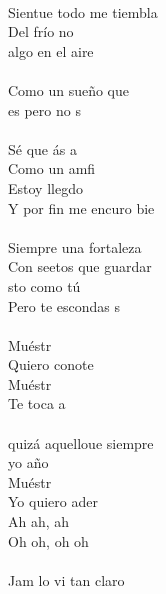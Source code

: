 \begin{cancion}%
	     \chord{(}{**)}{    }\\
	Sientue todo me tiembla \\
	Del frío no \\
	 algo en el aire\\
	\jump\\
Como un sueño que \\
	es pero no s\\
	\jump\\
	Sé que ás a\\
	Como un amfi\\
	Estoy llegdo\\
	Y por fin me encuro bie\\
	\jump\\
	Siempre  una fortaleza\\
	Con seetos que guardar\\
	sto como tú\\
	Pero  te escondas s\\
	\jump\\
	Muéstr \\
	Quiero conote\\
	Muéstr \\
	Te toca a \\
	\jump\\
	 quizá aquelloue siempre\\
	yo año    \\
	Muéstr \\
	Yo quiero ader\\
	Ah ah, ah     \\
	Oh oh, oh oh \\
	\jump\\
	Jam lo vi tan claro     \\

\end{cancion}
